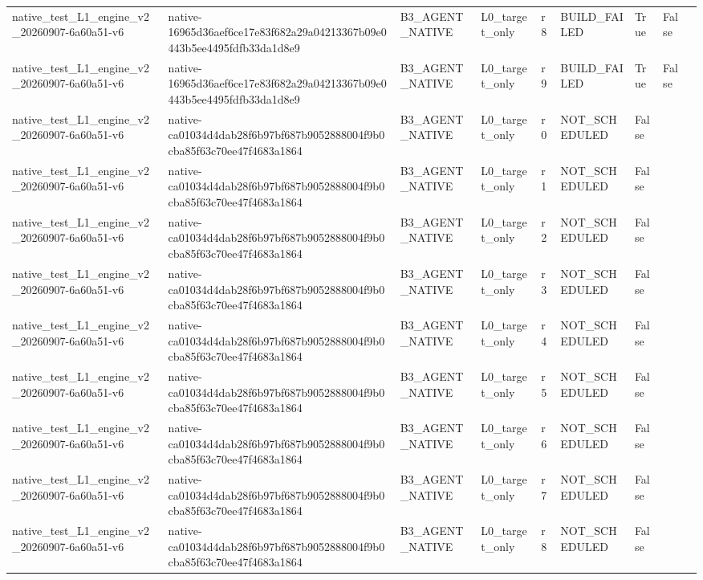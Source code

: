 \begin{tabular}{lllllllll}
native\_test\_L1\_engine\_v2\_20260907-6a60a51-v6 & native-16965d36aef6ce17e83f682a29a04213367b09e0443b5ee4495fdfb33da1d8e9 & B3\_AGENT\_NATIVE & L0\_target\_only & r8 & BUILD\_FAILED & True & False &  \\
native\_test\_L1\_engine\_v2\_20260907-6a60a51-v6 & native-16965d36aef6ce17e83f682a29a04213367b09e0443b5ee4495fdfb33da1d8e9 & B3\_AGENT\_NATIVE & L0\_target\_only & r9 & BUILD\_FAILED & True & False &  \\
native\_test\_L1\_engine\_v2\_20260907-6a60a51-v6 & native-ca01034d4dab28f6b97bf687b9052888004f9b0cba85f63c70ee47f4683a1864 & B3\_AGENT\_NATIVE & L0\_target\_only & r0 & NOT\_SCHEDULED & False &  &  \\
native\_test\_L1\_engine\_v2\_20260907-6a60a51-v6 & native-ca01034d4dab28f6b97bf687b9052888004f9b0cba85f63c70ee47f4683a1864 & B3\_AGENT\_NATIVE & L0\_target\_only & r1 & NOT\_SCHEDULED & False &  &  \\
native\_test\_L1\_engine\_v2\_20260907-6a60a51-v6 & native-ca01034d4dab28f6b97bf687b9052888004f9b0cba85f63c70ee47f4683a1864 & B3\_AGENT\_NATIVE & L0\_target\_only & r2 & NOT\_SCHEDULED & False &  &  \\
native\_test\_L1\_engine\_v2\_20260907-6a60a51-v6 & native-ca01034d4dab28f6b97bf687b9052888004f9b0cba85f63c70ee47f4683a1864 & B3\_AGENT\_NATIVE & L0\_target\_only & r3 & NOT\_SCHEDULED & False &  &  \\
native\_test\_L1\_engine\_v2\_20260907-6a60a51-v6 & native-ca01034d4dab28f6b97bf687b9052888004f9b0cba85f63c70ee47f4683a1864 & B3\_AGENT\_NATIVE & L0\_target\_only & r4 & NOT\_SCHEDULED & False &  &  \\
native\_test\_L1\_engine\_v2\_20260907-6a60a51-v6 & native-ca01034d4dab28f6b97bf687b9052888004f9b0cba85f63c70ee47f4683a1864 & B3\_AGENT\_NATIVE & L0\_target\_only & r5 & NOT\_SCHEDULED & False &  &  \\
native\_test\_L1\_engine\_v2\_20260907-6a60a51-v6 & native-ca01034d4dab28f6b97bf687b9052888004f9b0cba85f63c70ee47f4683a1864 & B3\_AGENT\_NATIVE & L0\_target\_only & r6 & NOT\_SCHEDULED & False &  &  \\
native\_test\_L1\_engine\_v2\_20260907-6a60a51-v6 & native-ca01034d4dab28f6b97bf687b9052888004f9b0cba85f63c70ee47f4683a1864 & B3\_AGENT\_NATIVE & L0\_target\_only & r7 & NOT\_SCHEDULED & False &  &  \\
native\_test\_L1\_engine\_v2\_20260907-6a60a51-v6 & native-ca01034d4dab28f6b97bf687b9052888004f9b0cba85f63c70ee47f4683a1864 & B3\_AGENT\_NATIVE & L0\_target\_only & r8 & NOT\_SCHEDULED & False &  &  \\

\end{tabular}
